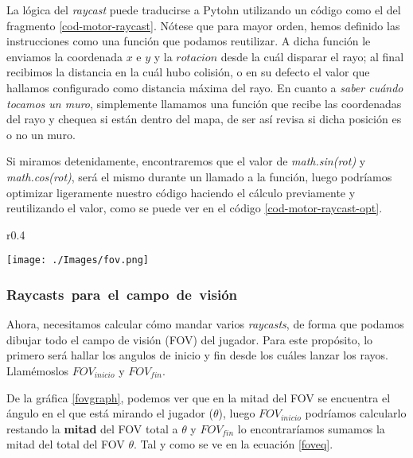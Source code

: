 La lógica del \emph{raycast} puede traducirse a Pytohn utilizando un código como el del fragmento \ref{cod-motor-raycast}. Nótese que para mayor orden, hemos definido las instrucciones como una función que podamos reutilizar. A dicha función le enviamos la coordenada $x$ e $y$ y la $rotacion$ desde la cuál disparar el rayo; al final recibimos la distancia en la cuál hubo colisión, o en su defecto el valor que hallamos configurado como distancia máxima del rayo. En cuanto a \emph{saber cuándo tocamos un muro}, simplemente llamamos una función que recibe las coordenadas del rayo y chequea si están dentro del mapa, de ser así revisa si dicha posición es o no un muro.



Si miramos detenidamente, encontraremos que el valor de \emph{math.sin(rot)} y \emph{math.cos(rot)}, será el mismo durante un llamado a la función, luego podríamos optimizar ligeramente nuestro código haciendo el cálculo previamente y reutilizando el valor, como se puede ver en el código \ref{cod-motor-raycast-opt}.

\newpage




\begin{wrapfigure}{r}{0.4\textwidth}	
	\begin{center}
		\texttt{[image: ./Images/fov.png]}
	\end{center}
	\caption{El campo de visión del jugador.}
	\label{fovgraph}	
\end{wrapfigure}

\subsubsection{\mbox{Raycasts para el campo de visión}}

Ahora, necesitamos calcular cómo mandar varios \emph{raycasts}, de forma que podamos dibujar todo el campo de visión (FOV) del jugador. Para este propósito, lo primero será hallar los angulos de inicio y fin desde los cuáles lanzar los rayos. Llamémoslos $FOV_{inicio}$ y $FOV_{fin}$.

De la gráfica \ref{fovgraph}, podemos ver que en la mitad del FOV se encuentra el ángulo en el que está mirando el jugador ($\theta$), luego $FOV_{inicio}$ podríamos calcularlo restando la \textbf{mitad} del FOV total a $\theta$ y $FOV_{fin}$ lo encontraríamos sumamos la mitad del total del FOV $\theta$. Tal y como se ve en la ecuación \ref{foveq}. 

